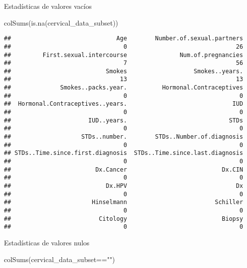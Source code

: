 \documentclass[
]{article}
\newenvironment{Shaded}{\begin{snugshade}}{\end{snugshade}}
\newcommand{\FunctionTok}[1]{\textcolor[rgb]{0.94,0.94,0.56}{#1}}
\newcommand{\NormalTok}[1]{\textcolor[rgb]{0.80,0.80,0.80}{#1}}
\newcommand{\SpecialCharTok}[1]{\textcolor[rgb]{0.86,0.64,0.64}{#1}}
\newcommand{\StringTok}[1]{\textcolor[rgb]{0.80,0.58,0.58}{#1}}
\begin{document}
Estadísticas de valores vacíos

\begin{Shaded}
\begin{Highlighting}[]
\FunctionTok{colSums}\NormalTok{(}\FunctionTok{is.na}\NormalTok{(cervical\_data\_subset))}
\end{Highlighting}
\end{Shaded}

\begin{verbatim}
##                              Age        Number.of.sexual.partners 
##                                0                               26 
##         First.sexual.intercourse               Num.of.pregnancies 
##                                7                               56 
##                           Smokes                   Smokes..years. 
##                               13                               13 
##              Smokes..packs.year.          Hormonal.Contraceptives 
##                                0                                0 
##  Hormonal.Contraceptives..years.                              IUD 
##                                0                                0 
##                      IUD..years.                             STDs 
##                                0                                0 
##                    STDs..number.        STDs..Number.of.diagnosis 
##                                0                                0 
## STDs..Time.since.first.diagnosis  STDs..Time.since.last.diagnosis 
##                                0                                0 
##                        Dx.Cancer                           Dx.CIN 
##                                0                                0 
##                           Dx.HPV                               Dx 
##                                0                                0 
##                       Hinselmann                         Schiller 
##                                0                                0 
##                         Citology                           Biopsy 
##                                0                                0
\end{verbatim}

Estadísticas de valores nulos

\begin{Shaded}
\begin{Highlighting}[]
\FunctionTok{colSums}\NormalTok{(cervical\_data\_subset}\SpecialCharTok{==}\StringTok{""}\NormalTok{)}
\end{Highlighting}
\end{Shaded}
\end{document}
